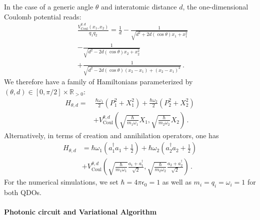 \documentclass[reprint, amsmath, amssymb, floatfix, aps, pra]{revtex4-2}
\begin{document}
        In the case of a generic angle $\theta$ and interatomic distance $d$, the one-dimensional Coulomb potential reads:
        \begin{equation*}
        \begin{split}
            &\frac{V_\text{Coul}^{\theta, d}(x_1, x_2)}{q_1q_2} = \frac{1}{d} - \frac{1}{\sqrt{d^2+2d(\cos\theta) x_1+x_1^2}} \\
            &- \frac{1}{\sqrt{d^2-2d(\cos\theta) x_2+x_2^2}} \\
            &+\frac{1}{\sqrt{d^2 - 2d(\cos\theta) (x_2-x_1) + (x_2-x_1)^2}}\,.
        \end{split}
        \end{equation*}
        We therefore have a family of Hamiltonians parameterized by $(\theta, d)\in[0, \pi/2]\times\mathbb R_{>0}$:
        \begin{equation}
        \label{eq:finalHamiltonian}
        \begin{split}
            H_{\theta, d}=&\ \frac{\hbar\omega_1}{2}\left(P_1^2 + X_1^2\right) + \frac{\hbar\omega_2}{2}\left(P_2^2 + X_2^2\right)\\
            &+V_\text{Coul}^{\theta, d}\left(\sqrt{\frac{\hbar}{m_1\omega_1}}X_1, \sqrt{\frac{\hbar}{m_2\omega_2}}X_2\right)\,.
        \end{split}
        \end{equation}
        Alternatively, in terms of creation and annihilation operators, one has
        \begin{equation}
        \label{eq:Hamiltonian_heterodyne}
        \begin{split}
            H_{\theta, d} &= \hbar\omega_1\left( a_{1}^\dagger a_{1} +\frac{1}{2}\right) + \hbar\omega_2\left(a_{2}^\dagger a_{2} +\frac{1}{2}\right) \\
            & + V_\text{Coul}^{\theta, d}\left(\sqrt{\frac{\hbar}{m_1\omega_1}}\frac{a_1 + a_1^\dagger}{\sqrt 2}, \sqrt{\frac{\hbar}{m_2\omega_2}}\frac{a_2 + a_2^\dagger}{\sqrt 2}\right)\,.
        \end{split}
        \end{equation}
        For the numerical simulations, we set $\hbar=4\pi\epsilon_0=1$ as well as $m_i=q_i=\omega_i=1$ for both QDOs.
\newline
\paragraph*{Photonic circuit and Variational Algorithm}
\end{document}
